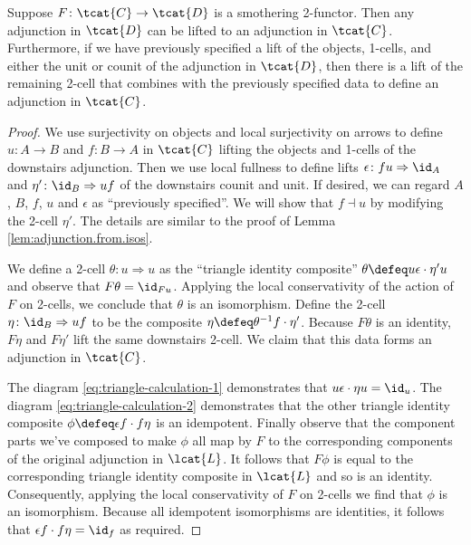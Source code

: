 \begin{lem}\label{lem:missed-lemma} Suppose $F \colon \tcat{C} \to \tcat{D}$ is a smothering 2-functor. Then any adjunction in $\tcat{D}$ can be lifted to an adjunction in $\tcat{C}$. Furthermore, if we have previously specified a lift of the objects, 1-cells, and either the unit or counit of the adjunction in $\tcat{D}$, then there is a lift of the remaining 2-cell that combines with the previously specified data to define an adjunction in $\tcat{C}$.
\end{lem}
\begin{proof}
We use surjectivity on objects and local surjectivity on arrows to define $u \colon A \to B$ and $f\colon B\to A$ in $\tcat{C}$ lifting the objects and 1-cells of the downstairs adjunction. Then we use local fullness to define lifts $\epsilon \colon fu \Rightarrow \id_A$ and $\eta' \colon \id_B \Rightarrow uf$ of the downstairs counit and unit. If desired, we can regard $A$, $B$, $f$, $u$ and $\epsilon$ as ``previously specified''. We will show that $f \dashv u$ by modifying the 2-cell $\eta'$. The details are similar to the proof of Lemma \ref{lem:adjunction.from.isos}.

We define a 2-cell $\theta\colon u\Rightarrow u$ as the ``triangle identity composite'' $\theta\defeq u\epsilon \cdot \eta' u$ and observe that $F\theta = \id_{Fu}$. Applying the local conservativity of the action of $F$ on 2-cells, we conclude that $\theta$ is an isomorphism. Define the 2-cell $\eta \colon \id_B \Rightarrow uf$ to be the composite $\eta \defeq \theta^{-1} f \cdot \eta'$. Because $F\theta$ is an identity,  $F\eta$ and $F\eta'$ lift the same downstairs 2-cell. We claim that this data forms an adjunction in $\tcat{C}$.

The diagram \eqref{eq:triangle-calculation-1} demonstrates that $u\epsilon \cdot \eta u = \id_u$. The diagram \eqref{eq:triangle-calculation-2} demonstrates that the other triangle identity composite $\phi\defeq \epsilon f \cdot f \eta $ is an idempotent. Finally observe that the component parts we've composed to make $\phi$ all map by $F$ to the corresponding components of the original adjunction in $\lcat{L}$. It follows that $F\phi$ is equal to the corresponding triangle identity composite in $\lcat{L}$ and so is an identity. Consequently, applying the local conservativity of $F$ on 2-cells we find that $\phi$ is an isomorphism. Because all idempotent isomorphisms are identities,  it follows that $\epsilon f \cdot f \eta = \id_f$ as required.
\end{proof} 

